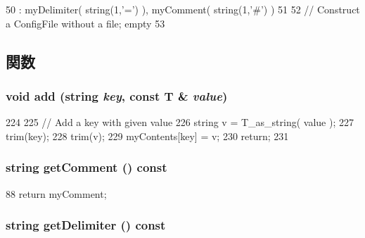 \begin{DoxyCode}
50     : myDelimiter( string(1,'=') ), myComment( string(1,'#') )
51 {
52     // Construct a ConfigFile without a file; empty
53 }
\end{DoxyCode}


\subsection{関数}
\hypertarget{classConfigFile_ae5572f6ea39c55a1dd89ce5d010171b3}{
\subsubsection[{add}]{\setlength{\rightskip}{0pt plus 5cm}void add (string {\em key}, \/  const T \& {\em value})}}
\label{classConfigFile_ae5572f6ea39c55a1dd89ce5d010171b3}



\begin{DoxyCode}
224 {
225         // Add a key with given value
226         string v = T_as_string( value );
227         trim(key);
228         trim(v);
229         myContents[key] = v;
230         return;
231 }
\end{DoxyCode}
\hypertarget{classConfigFile_a38c1221545e57988ae11c60f695eff07}{
\subsubsection[{getComment}]{\setlength{\rightskip}{0pt plus 5cm}string getComment () const}}
\label{classConfigFile_a38c1221545e57988ae11c60f695eff07}



\begin{DoxyCode}
88 { return myComment; }
\end{DoxyCode}
\hypertarget{classConfigFile_a444984d73515fa482ed20213fd9e650e}{
\subsubsection[{getDelimiter}]{\setlength{\rightskip}{0pt plus 5cm}string getDelimiter () const}}
\label{classConfigFile_a444984d73515fa482ed20213fd9e650e}



